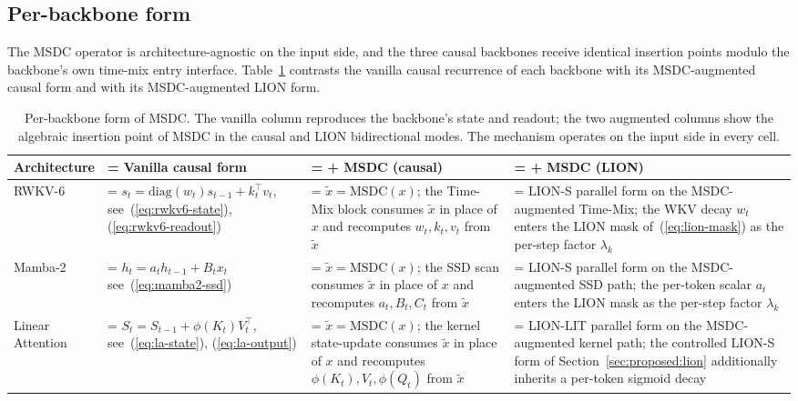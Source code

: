 \subsection{Per-backbone form}

The MSDC operator is architecture-agnostic on the input side, and
the three causal backbones receive identical insertion points modulo
the backbone's own time-mix entry interface.
Table~\ref{tab:msdc-deployment} contrasts the vanilla causal
recurrence of each backbone with its MSDC-augmented causal form and
with its MSDC-augmented LION form.

\begin{table}[t]
\centering
\small
\caption[Per-backbone form of Multi-Scale Depthwise
Convolution]{Per-backbone form of MSDC. The vanilla column
reproduces the backbone's state and readout; the two augmented
columns show the algebraic insertion point of MSDC in the causal
and LION bidirectional modes. The mechanism operates on the input
side in every cell.}
\label{tab:msdc-deployment}
\setlength{\tabcolsep}{4pt}
\renewcommand{\arraystretch}{1.25}
\begin{tabularx}{\linewidth}{@{}p{2.1cm} >{\hsize=1.15\hsize\linewidth=\hsize}X >{\hsize=0.95\hsize\linewidth=\hsize}X >{\hsize=0.90\hsize\linewidth=\hsize}X@{}}
\toprule
\textbf{Architecture} & \textbf{Vanilla causal form} & \textbf{+ MSDC (causal)} & \textbf{+ MSDC (LION)} \\
\midrule
RWKV-6 &
$s_{t} = \mathrm{diag}(w_{t}) s_{t-1} + k_{t}^{\top} v_{t}$, see~(\ref{eq:rwkv6-state}), (\ref{eq:rwkv6-readout}) &
$\tilde{x} = \mathrm{MSDC}(x)$; the Time-Mix block consumes $\tilde{x}$ in place of $x$ and recomputes $w_{t}, k_{t}, v_{t}$ from $\tilde{x}$ &
LION-S parallel form on the MSDC-augmented Time-Mix; the WKV decay $w_{t}$ enters the LION mask of~(\ref{eq:lion-mask}) as the per-step factor $\lambda_{k}$ \\
\addlinespace
Mamba-2 &
\shortstack[l]{$h_{t} = a_{t} h_{t-1} + B_{t} x_{t}$\\see~(\ref{eq:mamba2-ssd})} &
$\tilde{x} = \mathrm{MSDC}(x)$; the SSD scan consumes $\tilde{x}$ in place of $x$ and recomputes $a_{t}, B_{t}, C_{t}$ from $\tilde{x}$ &
LION-S parallel form on the MSDC-augmented SSD path; the per-token scalar $a_{t}$ enters the LION mask as the per-step factor $\lambda_{k}$ \\
\addlinespace
\shortstack[l]{Linear\\Attention} &
$S_{t} = S_{t-1} + \phi(K_{t}) V_{t}^{\top}$, see~(\ref{eq:la-state}), (\ref{eq:la-output}) &
$\tilde{x} = \mathrm{MSDC}(x)$; the kernel state-update consumes $\tilde{x}$ in place of $x$ and recomputes $\phi(K_{t}), V_{t}, \phi(Q_{t})$ from $\tilde{x}$ &
LION-LIT parallel form on the MSDC-augmented kernel path; the controlled LION-S form of Section~\ref{sec:proposed:lion} additionally inherits a per-token sigmoid decay \\
\bottomrule
\end{tabularx}
\end{table}

